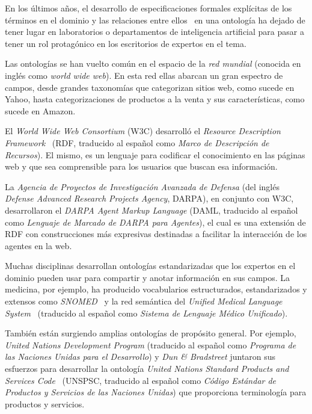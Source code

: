 \label{chapter:automatic_generation_of_ontologies}

En los últimos años, el desarrollo de especificaciones formales explícitas de los términos en el dominio y las relaciones entre ellos~\cite{ref:4} en una ontología ha dejado de tener lugar en laboratorios o departamentos de inteligencia artificial para pasar a tener un rol protagónico en los escritorios de expertos en el tema.

Las ontologías se han vuelto común en el espacio de la \textit{red mundial} (conocida en inglés como \textit{world wide web}). En esta red ellas abarcan un gran espectro de campos, desde grandes taxonomías que categorizan sitios web, como sucede en Yahoo, hasta categorizaciones de productos a la venta y sus características, como sucede en Amazon.

El \textit{World Wide Web Consortium} (W3C) desarrolló el \textit{Resource Description Framework}~\cite{ref:5} (RDF, traducido al español como \textit{Marco de Descripción de Recursos}). El mismo, es un lenguaje para codificar el conocimiento en las páginas web y que sea comprensible para los usuarios que buscan esa información.

La \textit{Agencia de Proyectos de Investigación Avanzada de Defensa} (del inglés \textit{Defense Advanced Research Projects Agency}, DARPA), en conjunto con W3C, desarrollaron el \textit{DARPA Agent Markup Language} (DAML, traducido al español como \textit{Lenguaje de Marcado de DARPA para Agentes}), el cual es una extensión de RDF con construcciones más expresivas destinadas a facilitar la interacción de los agentes en la web.~\cite{ref:6}

Muchas disciplinas desarrollan ontologías estandarizadas que los expertos en el dominio pueden usar para compartir y anotar información en sus campos. La medicina, por ejemplo, ha producido vocabularios estructurados, estandarizados y extensos como \textit{SNOMED}~\cite{ref:7} y la red semántica del \textit{Unified Medical Language System}~\cite{ref:8} (traducido al español como \textit{Sistema de Lenguaje Médico Unificado}).

También están surgiendo amplias ontologías de propósito general. Por ejemplo, \textit{United Nations Development Program} (traducido al español como \textit{Programa de las Naciones Unidas para el Desarrollo}) y \textit{Dun \& Bradstreet} juntaron sus esfuerzos para desarrollar la ontología \textit{United Nations Standard Products and Services Code}~\cite{ref:9} (UNSPSC, traducido al español como \textit{Código Estándar de Productos y Servicios de las Naciones Unidas}) que proporciona terminología para productos y servicios.

